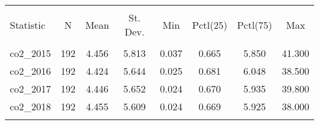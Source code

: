 
\begin{table}[!htbp] \centering 
  \caption{} 
  \label{} 
\begin{tabular}{@{\extracolsep{5pt}}lccccccc} 
\\[-1.8ex]\hline 
\hline \\[-1.8ex] 
Statistic & \multicolumn{1}{c}{N} & \multicolumn{1}{c}{Mean} & \multicolumn{1}{c}{St. Dev.} & \multicolumn{1}{c}{Min} & \multicolumn{1}{c}{Pctl(25)} & \multicolumn{1}{c}{Pctl(75)} & \multicolumn{1}{c}{Max} \\ 
\hline \\[-1.8ex] 
co2\_2015 & 192 & 4.456 & 5.813 & 0.037 & 0.665 & 5.850 & 41.300 \\ 
co2\_2016 & 192 & 4.424 & 5.644 & 0.025 & 0.681 & 6.048 & 38.500 \\ 
co2\_2017 & 192 & 4.446 & 5.652 & 0.024 & 0.670 & 5.935 & 39.800 \\ 
co2\_2018 & 192 & 4.455 & 5.609 & 0.024 & 0.669 & 5.925 & 38.000 \\ 
\hline \\[-1.8ex] 
\end{tabular} 
\end{table} 
